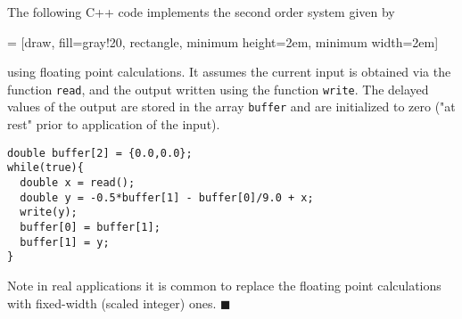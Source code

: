 \begin{example} The following C++ code implements the second order system given by
\begin{center}
   = [draw, fill=gray!20, rectangle, 
      minimum height=2em, minimum width=2em]
\end{center}
using floating point calculations. It assumes the current input is obtained via the function \texttt{read}, and the output written using the function \texttt{write}. The delayed values of the output are stored in the array \texttt{buffer} and are initialized to zero ("at rest" prior to application of the input).
\begin{verbatim}
double buffer[2] = {0.0,0.0};
while(true){
  double x = read();
  double y = -0.5*buffer[1] - buffer[0]/9.0 + x;
  write(y);
  buffer[0] = buffer[1];
  buffer[1] = y;
}
\end{verbatim}
Note in real applications it is common to replace the floating point calculations with fixed-width (scaled integer) ones.
$\blacksquare$
\end{example}

